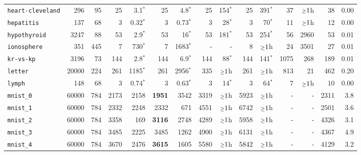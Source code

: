 \begin{tabular}{lccrrrrrrrrrrrr}
\texttt{heart-cleveland} & \multicolumn{1}{r}{296} & \multicolumn{1}{r}{95}  & 25 & 3.1$^*$ & 25 & 4.8$^*$ & 25 & 154$^*$ & 25 & 391$^*$ & 37 & $\mathsmaller{\geq}1$h & 38 & 0.00\\
\texttt{hepatitis} & \multicolumn{1}{r}{137} & \multicolumn{1}{r}{68}  & 3 & 0.32$^*$ & 3 & 0.73$^*$ & 3 & 28$^*$ & 3 & 70$^*$ & 11 & $\mathsmaller{\geq}1$h & 12 & 0.00\\
\texttt{hypothyroid} & \multicolumn{1}{r}{3247} & \multicolumn{1}{r}{88}  & 53 & 2.9$^*$ & 53 & 16$^*$ & 53 & 181$^*$ & 53 & 254$^*$ & 56 & 2960 & 53 & 0.01\\
\texttt{ionosphere} & \multicolumn{1}{r}{351} & \multicolumn{1}{r}{445}  & 7 & 730$^*$ & 7 & 1683$^*$ & - & - & 8 & $\mathsmaller{\geq}1$h & 24 & 3501 & 27 & 0.01\\
\texttt{kr-vs-kp} & \multicolumn{1}{r}{3196} & \multicolumn{1}{r}{73}  & 144 & 2.8$^*$ & 144 & 6.9$^*$ & 144 & 88$^*$ & 144 & 141$^*$ & 1075 & 268 & 189 & 0.01\\
\texttt{letter} & \multicolumn{1}{r}{20000} & \multicolumn{1}{r}{224}  & 261 & 1185$^*$ & 261 & 2956$^*$ & 335 & $\mathsmaller{\geq}1$h & 261 & $\mathsmaller{\geq}1$h & 813 & 21 & 462 & 0.20\\
\texttt{lymph} & \multicolumn{1}{r}{148} & \multicolumn{1}{r}{68}  & 3 & 0.74$^*$ & 3 & 0.63$^*$ & 3 & 14$^*$ & 3 & 64$^*$ & 7 & $\mathsmaller{\geq}1$h & 10 & 0.00\\
\texttt{mnist\_0} & \multicolumn{1}{r}{60000} & \multicolumn{1}{r}{784}  & 2173 & 2158 & \textbf{1951} & 3542 & 3319 & $\mathsmaller{\geq}1$h & 5923 & $\mathsmaller{\geq}1$h & - & - & 2311 & 3.8\\
\texttt{mnist\_1} & \multicolumn{1}{r}{60000} & \multicolumn{1}{r}{784}  & 2332 & 2248 & 2332 & 671 & 4551 & $\mathsmaller{\geq}1$h & 6742 & $\mathsmaller{\geq}1$h & - & - & 2501 & 3.6\\
\texttt{mnist\_2} & \multicolumn{1}{r}{60000} & \multicolumn{1}{r}{784}  & 3358 & 169 & \textbf{3116} & 2748 & 4289 & $\mathsmaller{\geq}1$h & 5958 & $\mathsmaller{\geq}1$h & - & - & 4326 & 3.1\\
\texttt{mnist\_3} & \multicolumn{1}{r}{60000} & \multicolumn{1}{r}{784}  & 3485 & 2225 & 3485 & 1262 & 4900 & $\mathsmaller{\geq}1$h & 6131 & $\mathsmaller{\geq}1$h & - & - & 4367 & 4.9\\
\texttt{mnist\_4} & \multicolumn{1}{r}{60000} & \multicolumn{1}{r}{784}  & 3670 & 2476 & \textbf{3615} & 1605 & 5580 & $\mathsmaller{\geq}1$h & 5842 & $\mathsmaller{\geq}1$h & - & - & 4129 & 3.2\\

\end{tabular}
